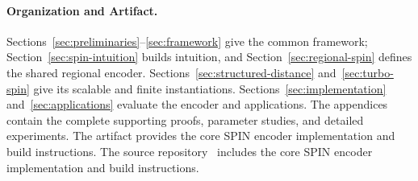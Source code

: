\paragraph{Organization and Artifact.}
Sections~\ref{sec:preliminaries}--\ref{sec:framework} give the common framework;
Section~\ref{sec:spin-intuition} builds intuition, and
Section~\ref{sec:regional-spin} defines the shared regional encoder.
Sections~\ref{sec:structured-distance} and~\ref{sec:turbo-spin}
give its scalable and finite instantiations.
Sections~\ref{sec:implementation} and~\ref{sec:applications} evaluate the encoder
and applications. The appendices contain the complete supporting proofs,
parameter studies, and detailed experiments.
\ifsubmission
The artifact provides the core SPIN encoder implementation and build instructions.
\else
The source repository~\cite{spinCodeRepository} includes the core SPIN
encoder implementation and build instructions.
\fi
